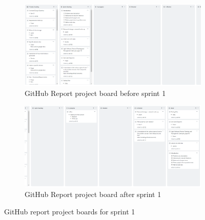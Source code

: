 \documentclass[10pt, notitlepage]{report}
\begin{document}
\begin{figure}[!h]
\centering
\begin{subfigure}{\textwidth}
	\centering	
	\includegraphics[width=1\linewidth]{git-report-1-before.png}
	\caption{GitHub Report project board before sprint 1}
	\label{fig:agileapp-rb1}
\end{subfigure}
\begin{subfigure}{\textwidth}
	\centering	
	\includegraphics[width=1\linewidth]{git-report-1-after.png}
	\caption{GitHub Report project board after sprint 1}
	\label{fig:agileapp-ra1}
\end{subfigure}

\caption{GitHub report project boards for sprint 1}

\end{figure}

\newpage
\end{document}
